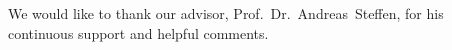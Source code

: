 

\begin{acknowledgements}
\addchaptertocentry{\acknowledgementname} %
We would like to thank our advisor, Prof.~Dr.~Andreas~Steffen, for his continuous support and helpful comments.

\end{acknowledgements}


\setcounter{tocdepth}{2}
\tableofcontents %




\mainmatter %

\pagestyle{thesis} %



\subsubsection*{} %
\label{lastpage} %

\cleardoublepage
\backmatter
{}

